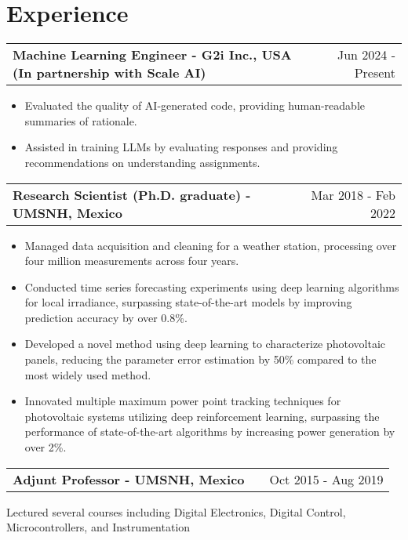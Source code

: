 \documentclass[a4paper,10pt]{article}
\makeatletter
\newenvironment{jobshort}[2]
    {
    \begin{tabularx}{\linewidth}{@{}l X r@{}}
    \textbf{#1} & \hfill &  #2 \\[3.75pt]
    \end{tabularx}
    }
    {
    }
\newenvironment{joblong}[2]
    {
    \begin{tabularx}{\linewidth}{@{}l X r@{}}
    \textbf{#1} & \hfill &  #2 \\[3.75pt]
    \end{tabularx}
    \begin{minipage}[t]{\linewidth}
    \begin{itemize}[nosep,after=\strut, leftmargin=1em, itemsep=3pt,label=--]
    }
    {
    \end{itemize}
    \end{minipage}    
    }
\makeatother
\begin{document}
\section{Experience}

\begin{joblong}{Machine Learning Engineer - G2i Inc., USA (In partnership with Scale AI)}{Jun 2024 - Present}
    \item Evaluated the quality of AI-generated code, providing human-readable summaries of rationale.
    \item Assisted in training LLMs by evaluating responses and providing recommendations on understanding assignments.
\end{joblong}

\begin{joblong}{Research Scientist (Ph.D. graduate) - UMSNH, Mexico}{Mar 2018 - Feb 2022}
\item Managed data acquisition and cleaning for a weather station, processing over four million measurements across four years.
\item Conducted time series forecasting experiments using deep learning algorithms for local irradiance, surpassing state-of-the-art models by improving prediction accuracy by over 0.8\%.
\item Developed a novel method using deep learning to characterize photovoltaic panels, reducing the parameter error estimation by 50\% compared to the most widely used method.
\item Innovated multiple maximum power point tracking techniques for photovoltaic systems utilizing deep reinforcement learning, surpassing the performance of state-of-the-art algorithms by increasing power generation by over 2\%.
\end{joblong}

\begin{jobshort}{Adjunt Professor - UMSNH, Mexico}{Oct 2015 - Aug 2019}
Lectured several courses including Digital Electronics, Digital Control, Microcontrollers, and Instrumentation
\end{jobshort}
\end{document}
